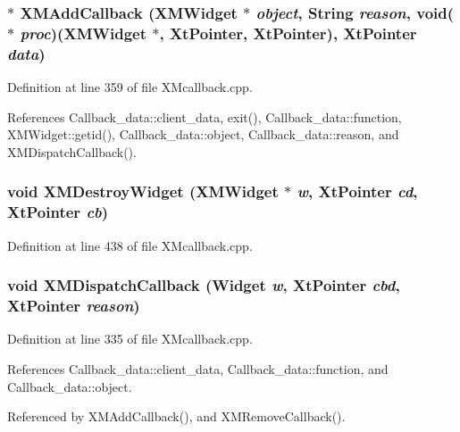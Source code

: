 \subsubsection{$\ast$ XMAdd\-Callback ({\bf XMWidget} $\ast$ {\em object}, String {\em reason}, void($\ast$ {\em proc})({\bf XMWidget} $\ast$, Xt\-Pointer, Xt\-Pointer), Xt\-Pointer {\em data})}\label{XMcallback_8cpp_a4}




Definition at line 359 of file XMcallback.cpp.

References Callback\_\-data::client\_\-data, exit(), Callback\_\-data::function, XMWidget::getid(), Callback\_\-data::object, Callback\_\-data::reason, and XMDispatch\-Callback().
\subsubsection{\setlength{\rightskip}{0pt plus 5cm}void XMDestroy\-Widget ({\bf XMWidget} $\ast$ {\em w}, Xt\-Pointer {\em cd}, Xt\-Pointer {\em cb})}\label{XMcallback_8cpp_a7}




Definition at line 438 of file XMcallback.cpp.
\subsubsection{\setlength{\rightskip}{0pt plus 5cm}void XMDispatch\-Callback (Widget {\em w}, Xt\-Pointer {\em cbd}, Xt\-Pointer {\em reason})\hspace{0.3cm}{\tt  [static]}}\label{XMcallback_8cpp_a3}




Definition at line 335 of file XMcallback.cpp.

References Callback\_\-data::client\_\-data, Callback\_\-data::function, and Callback\_\-data::object.

Referenced by XMAdd\-Callback(), and XMRemove\-Callback().
